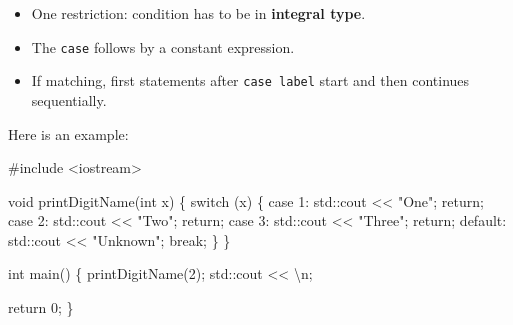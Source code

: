 \documentclass[
  letterpaper,
  DIV=11,
  numbers=noendperiod]{scrreprt}
\newenvironment{Shaded}{\begin{snugshade}}{\end{snugshade}}
\newcommand{\CommentTok}[1]{\textcolor[rgb]{0.37,0.37,0.37}{#1}}
\newcommand{\ControlFlowTok}[1]{\textcolor[rgb]{0.00,0.23,0.31}{#1}}
\newcommand{\DecValTok}[1]{\textcolor[rgb]{0.68,0.00,0.00}{#1}}
\newcommand{\ErrorTok}[1]{\textcolor[rgb]{0.68,0.00,0.00}{#1}}
\newcommand{\FunctionTok}[1]{\textcolor[rgb]{0.28,0.35,0.67}{#1}}
\newcommand{\NormalTok}[1]{\textcolor[rgb]{0.00,0.23,0.31}{#1}}
\newcommand{\SpecialCharTok}[1]{\textcolor[rgb]{0.37,0.37,0.37}{#1}}
\newcommand{\StringTok}[1]{\textcolor[rgb]{0.13,0.47,0.30}{#1}}
\begin{document}
\begin{tcolorbox}[enhanced jigsaw, toprule=.15mm, rightrule=.15mm, opacityback=0, breakable, leftrule=.75mm, colback=white, colframe=quarto-callout-note-color-frame, arc=.35mm, left=2mm, bottomrule=.15mm]
\begin{minipage}[t]{5.5mm}
\textcolor{quarto-callout-note-color}{\faInfo}
\end{minipage}%
\begin{minipage}[t]{\textwidth - 5.5mm}

\begin{itemize}
\item
  One restriction: condition has to be in \textbf{integral type}.
\item
  The \texttt{case} follows by a constant expression.
\item
  If matching, first statements after \texttt{case\ label} start and
  then continues sequentially.
\end{itemize}

\end{minipage}%
\end{tcolorbox}

Here is an example:

\begin{Shaded}
\begin{Highlighting}[]
\CommentTok{\#include \textless{}iostream\textgreater{}}

\NormalTok{void }\FunctionTok{printDigitName}\NormalTok{(int x)}
\NormalTok{\{}
    \ControlFlowTok{switch}\NormalTok{ (x)}
\NormalTok{    \{}
\NormalTok{    case }\DecValTok{1}\SpecialCharTok{:}
\NormalTok{        std}\SpecialCharTok{::}\NormalTok{cout }\SpecialCharTok{\textless{}}\ErrorTok{\textless{}} \StringTok{"One"}\NormalTok{;}
\NormalTok{        return;}
\NormalTok{    case }\DecValTok{2}\SpecialCharTok{:}
\NormalTok{        std}\SpecialCharTok{::}\NormalTok{cout }\SpecialCharTok{\textless{}}\ErrorTok{\textless{}} \StringTok{"Two"}\NormalTok{;}
\NormalTok{        return;}
\NormalTok{    case }\DecValTok{3}\SpecialCharTok{:}
\NormalTok{        std}\SpecialCharTok{::}\NormalTok{cout }\SpecialCharTok{\textless{}}\ErrorTok{\textless{}} \StringTok{"Three"}\NormalTok{;}
\NormalTok{        return;}
\NormalTok{    default}\SpecialCharTok{:}
\NormalTok{        std}\SpecialCharTok{::}\NormalTok{cout }\SpecialCharTok{\textless{}}\ErrorTok{\textless{}} \StringTok{"Unknown"}\NormalTok{;}
        \ControlFlowTok{break}\NormalTok{;}
\NormalTok{    \}}
\NormalTok{\}}

\NormalTok{int }\FunctionTok{main}\NormalTok{()}
\NormalTok{\{}
    \FunctionTok{printDigitName}\NormalTok{(}\DecValTok{2}\NormalTok{);}
\NormalTok{    std}\SpecialCharTok{::}\NormalTok{cout }\SpecialCharTok{\textless{}}\ErrorTok{\textless{}} \StringTok{\textquotesingle{}}\SpecialCharTok{\textbackslash{}n}\StringTok{\textquotesingle{}}\NormalTok{;}

\NormalTok{    return }\DecValTok{0}\NormalTok{;}
\NormalTok{\}}
\end{Highlighting}
\end{Shaded}
\end{document}
